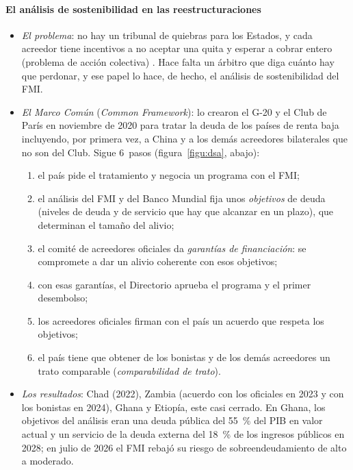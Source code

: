 \documentclass[11pt]{article}
\begin{document}
\paragraph{El análisis de sostenibilidad en las reestructuraciones}

\begin{itemize}
\item \emph{El problema}: no hay un tribunal de quiebras para los Estados, y cada acreedor tiene incentivos a no aceptar una quita y esperar a cobrar entero (problema de acción colectiva) . Hace falta un árbitro que diga cuánto hay que perdonar, y ese papel lo hace, de hecho, el análisis de sostenibilidad del FMI.
\item \emph{El Marco Común} (\emph{Common Framework}): lo crearon el G-20 y el Club de París en noviembre de 2020 para tratar la deuda de los países de renta baja incluyendo, por primera vez, a China y a los demás acreedores bilaterales que no son del Club\nocite{G20MarcoComun2020}. Sigue 6~pasos (figura~\ref{figu:dsa}, abajo):
  \begin{enumerate}
  \item el país pide el tratamiento y negocia un programa con el FMI;
  \item el análisis del FMI y del Banco Mundial fija unos \emph{objetivos} de deuda (niveles de deuda y de servicio que hay que alcanzar en un plazo), que determinan el tamaño del alivio;
  \item el comité de acreedores oficiales da \emph{garantías de financiación}: se compromete a dar un alivio coherente con esos objetivos;
  \item con esas garantías, el Directorio aprueba el programa y el primer desembolso;
  \item los acreedores oficiales firman con el país un acuerdo que respeta los objetivos;
  \item el país tiene que obtener de los bonistas y de los demás acreedores un trato comparable (\emph{comparabilidad de trato}).
  \end{enumerate}
\item \emph{Los resultados}: Chad (2022), Zambia (acuerdo con los oficiales en 2023 y con los bonistas en 2024), Ghana y Etiopía, este casi cerrado\nocite{GSDR2026Informe}. En Ghana, los objetivos del análisis eran una deuda pública del 55~\% del PIB en valor actual y un servicio de la deuda externa del 18~\% de los ingresos públicos en 2028; en julio de 2026 el FMI rebajó su riesgo de sobreendeudamiento de alto a moderado\nocite{FMI2023GhanaDSA,FMI2026GhanaRev6}.

\end{itemize}
\end{document}

